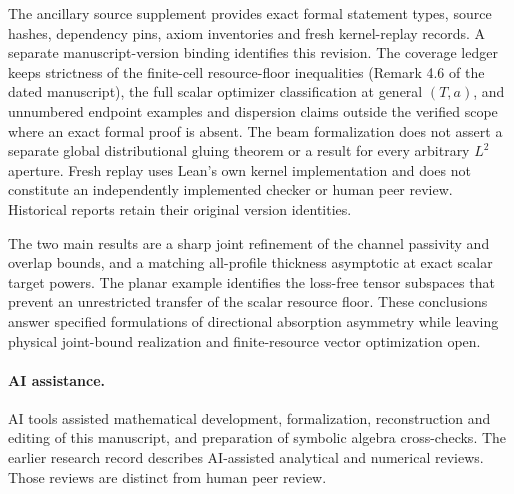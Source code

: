 \documentclass[11pt,a4paper]{article}
\theoremstyle{remark}
\begin{document}
The ancillary source supplement provides exact formal statement types, source hashes, dependency pins, axiom inventories and fresh kernel-replay records. A separate manuscript-version binding identifies this revision. The coverage ledger keeps strictness of the finite-cell resource-floor inequalities (Remark 4.6 of the dated manuscript), the full scalar optimizer classification at general $(T,a)$, and unnumbered endpoint examples and dispersion claims outside the verified scope where an exact formal proof is absent. The beam formalization does not assert a separate global distributional gluing theorem or a result for every arbitrary $L^2$ aperture. Fresh replay uses Lean's own kernel implementation and does not constitute an independently implemented checker or human peer review. Historical reports retain their original version identities.

The two main results are a sharp joint refinement of the channel passivity and overlap bounds, and a matching all-profile thickness asymptotic at exact scalar target powers. The planar example identifies the loss-free tensor subspaces that prevent an unrestricted transfer of the scalar resource floor. These conclusions answer specified formulations of directional absorption asymmetry while leaving physical joint-bound realization and finite-resource vector optimization open.

\paragraph{AI assistance.} AI tools assisted mathematical development, formalization, reconstruction and editing of this manuscript, and preparation of symbolic algebra cross-checks. The earlier research record describes AI-assisted analytical and numerical reviews. Those reviews are distinct from human peer review.



\end{document}

